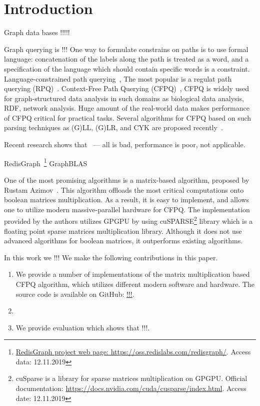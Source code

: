 \section{Introduction}

Graph data bases !!!!! 

Graph querying is !!! 
One way to formulate constrains on paths is to use formal language: concatenation of the labels along the path is treated as a word, and a specification of the language which should contain specific words is a constraint.
 Language-constrained path querying~\cite{FLCpathProblem}, 
The most popular is a regulat path querying (RPQ)~\cite{!!!}.
Context-Free Path Querying (CFPQ)~\cite{Yannakakis},  
CFPQ is widely used for graph-structured data analysis in such domains as biological data analysis, RDF, network analysis.
Huge amount of the real-world data makes performance of CFPQ critical for practical tasks.
Several algorithms for CFPQ based on such parsing techniques as (G)LL, (G)LR, and CYK are proposed recently~\cite{hellingsPathQuerying,Grigorev:2017:CPQ:3166094.3166104,Verbitskaia:2018:PCC:3241653.3241655,RDF,10.1007/978-3-319-91662-0_17,Medeiros:2018:EEC:3167132.3167265}.



Recent research shows that~\cite{Kuijpers:2019:ESC:3335783.3335791} --- all is bad, performance is poor, not applicable.

RedisGraph~\cite{8778293}\footnote{\url{RedisGraph project web page: https://oss.redislabs.com/redisgraph/}. Access data: 12.11.2019}
GraphBLAS~\cite{7761646}

One of the most promising algorithms is a matrix-based algorithm, proposed by Rustam Azimov~\cite{Azimov:2018:CPQ:3210259.3210264}.
This algorithm offloads the most critical computations onto boolean matrices multiplication.
As a result, it is easy to implement, and allows one to utilize modern massive-parallel hardware for CFPQ.
The implementation provided by the authors utilizes GPGPU by using cuSPARSE\footnote{cuSparse is a library for sparse matrices multiplication on GPGPU. Official documentation: \url{https://docs.nvidia.com/cuda/cusparse/index.html}. Access date: 12.11.2019} library which is a floating point sparse matrices multiplication library.
Although it does not use advanced algorithms for boolean matrices, it outperforms existing algorithms.


In this work we !!!
We make the following contributions in this paper.

\begin{enumerate}
\item We provide a number of implementations of the matrix multiplication based CFPQ algorithm, which utilizes different modern software and hardware.
The source code is available on GitHub: \url{!!!}.
\item 
\item We provide evaluation which shows that !!!.
\end{enumerate}
